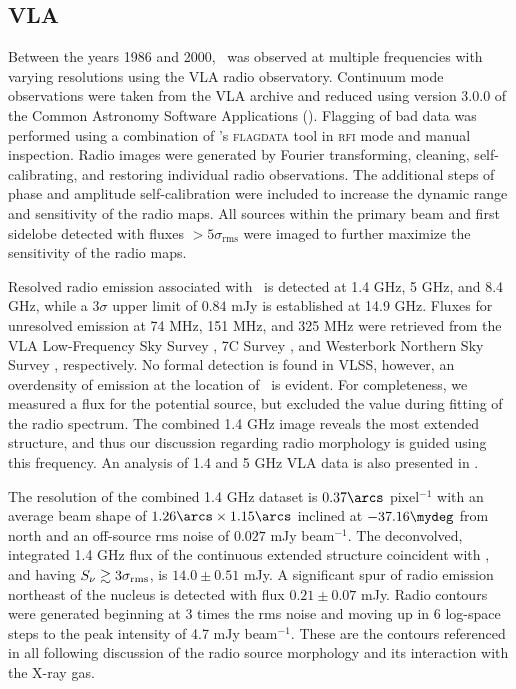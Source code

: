 \documentclass[useAMS,usenatbib]{mn2e}
\begin{document}
\subsection{VLA}
\label{sec:vla}

Between the years 1986 and 2000, \irs\ was observed at multiple
frequencies with varying resolutions using the VLA radio
observatory. Continuum mode observations were taken from the VLA
archive and reduced using version 3.0.0 of the Common Astronomy
Software Applications (\casa). Flagging of bad data was performed
using a combination of \casa's {\textsc{flagdata}} tool in
{\textsc{rfi}} mode and manual inspection. Radio images were generated
by Fourier transforming, cleaning, self-calibrating, and restoring
individual radio observations. The additional steps of phase and
amplitude self-calibration were included to increase the dynamic range
and sensitivity of the radio maps. All sources within the primary beam
and first sidelobe detected with fluxes $> 5\sigma_{\mathrm{rms}}$
were imaged to further maximize the sensitivity of the radio maps.

Resolved radio emission associated with \irs\ is detected at 1.4 GHz,
5 GHz, and 8.4 GHz, while a $3\sigma$ upper limit of $0.84$ mJy is
established at 14.9 GHz. Fluxes for unresolved emission at 74 MHz, 151
MHz, and 325 MHz were retrieved from the VLA Low-Frequency Sky Survey
\citep[VLSS;][]{vlss}, 7C Survey \citep{1999MNRAS.306...31R}, and
Westerbork Northern Sky Survey \citep[WENSS;][]{1997A&AS..124..259R},
respectively. No formal detection is found in VLSS, however, an
overdensity of emission at the location of \irs\ is evident. For
completeness, we measured a flux for the potential source, but
excluded the value during fitting of the radio spectrum. The combined
1.4 GHz image reveals the most extended structure, and thus our
discussion regarding radio morphology is guided using this
frequency. An analysis of 1.4 and 5 GHz VLA data is also presented in
\citet[][hereafter H93]{1993ApJ...415...82H}.

The resolution of the combined 1.4 GHz dataset is $0.37\arcs$
pixel$^{-1}$ with an average beam shape of $1.26\arcs \times
1.15\arcs$ inclined at $-37.16\mydeg$ from north and an off-source rms
noise of $0.027$ mJy beam$^{-1}$. The deconvolved, integrated 1.4 GHz
flux of the continuous extended structure coincident with \irs, and
having $S_{\nu} \gtrsim 3\sigma_{\mathrm{rms}}$, is $14.0 \pm 0.51$ mJy. A
significant spur of radio emission northeast of the nucleus is
detected with flux $0.21 \pm 0.07$ mJy. Radio contours were generated
beginning at 3 times the rms noise and moving up in 6 log-space steps
to the peak intensity of 4.7 mJy beam$^{-1}$. These are the contours
referenced in all following discussion of the radio source morphology
and its interaction with the X-ray gas.
\end{document}
